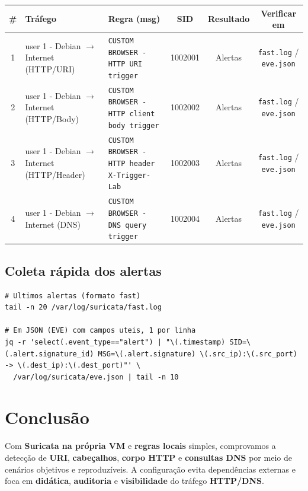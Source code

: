 \begin{tabularx}{\linewidth}{cXXccc}
\toprule
\textbf{\#} & \textbf{Tráfego} & \textbf{Regra (msg)} & \textbf{SID} & \textbf{Resultado} & \textbf{Verificar em} \\
\midrule
1 & user 1 - Debian $\rightarrow$ Internet (HTTP/URI)    & \texttt{CUSTOM BROWSER - HTTP URI trigger}          & 1002001 & Alertas & \texttt{fast.log} / \texttt{eve.json} \\
2 & user 1 - Debian $\rightarrow$ Internet (HTTP/Body)   & \texttt{CUSTOM BROWSER - HTTP client body trigger}  & 1002002 & Alertas & \texttt{fast.log} / \texttt{eve.json} \\
3 & user 1 - Debian $\rightarrow$ Internet (HTTP/Header) & \texttt{CUSTOM BROWSER - HTTP header X-Trigger-Lab} & 1002003 & Alertas & \texttt{fast.log} / \texttt{eve.json} \\
4 & user 1 - Debian $\rightarrow$ Internet (DNS)         & \texttt{CUSTOM BROWSER - DNS query trigger}         & 1002004 & Alertas & \texttt{fast.log} / \texttt{eve.json} \\
\bottomrule
\end{tabularx}

\subsection{Coleta rápida dos alertas}

\begin{lstlisting}
# Ultimos alertas (formato fast)
tail -n 20 /var/log/suricata/fast.log

# Em JSON (EVE) com campos uteis, 1 por linha
jq -r 'select(.event_type=="alert") | "\(.timestamp) SID=\(.alert.signature_id) MSG=\(.alert.signature) \(.src_ip):\(.src_port) -> \(.dest_ip):\(.dest_port)"' \
  /var/log/suricata/eve.json | tail -n 10
\end{lstlisting}


\section{Conclusão}

Com \textbf{Suricata na própria VM} e \textbf{regras locais} simples, comprovamos a detecção de \textbf{URI}, \textbf{cabeçalhos}, \textbf{corpo HTTP} e \textbf{consultas DNS} por meio de cenários objetivos e reproduzíveis. A configuração evita dependências externas e foca em \textbf{didática}, \textbf{auditoria} e \textbf{visibilidade} do tráfego \textbf{HTTP/DNS}.

